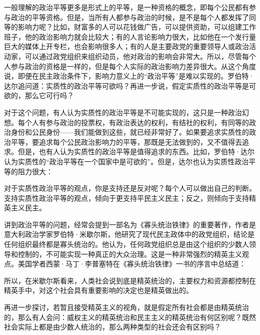 一般理解的政治平等更多是形式上的平等，是一种资格的概念，即每个公民都有参与政治的平等资格。但是，当所有人都参与政治的时候，是不是每个人都发挥了同等的影响力呢？比如，财富多的人可以花钱做广告，可以提供资助，可以组建工作班子，他的政治影响力就会比较大；有的人言论影响力很大，比如他在一个发行量巨大的媒体上开专栏，也会影响很多人；有的人是主要政党的重要领导人或政治活动家，可以通过政党组织来组织动员，他对政治的影响会非常大。所以，尽管每个人参与政治的资格是一样的，但是每个人实际的政治影响力差异很大。从这个角度说，即便在民主政治条件下，影响力意义上的“政治平等”是难以实现的。罗伯特·达尔追问道：实质性的政治平等可欲吗？再进一步说，假定实质性的政治平等是可欲的，那么它可行吗？

对于这个问题，有人认为实质性的政治平等是不可能实现的，这只是一种政治幻想。每个人有参与政治的投票权，有政治表达的权利，有结社的权利，有同等的政治身份和公民身份——我们能做到这些，就已经非常好了。如果要追求实质性的政治平等，要追求每个公民政治影响力的平等，那既是无法做到的，又不值得去追求。但是，也有人认为实质性的政治平等是值得追求的东西。比如，罗伯特·达尔认为实质性的“政治平等在一个国家中是可欲的”。但是，达尔也认为实质性政治平等的阻力很大：


对于实质性政治平等的观点，你是支持还是反对呢？每个人可以做出自己的判断。支持实质性政治平等的观点，倾向于更支持平民主义民主；反之，则倾向于支持精英主义民主。

讲到政治平等的问题，经常会提到一部名为《寡头统治铁律》的重要著作，作者是意大利政治学家罗伯特·米歇尔斯，他研究了现代民主政体中的政党组织，结论是任何组织最终都是寡头统治的。他认为，任何政党组织总是由这个组织的少数人领导和控制的，不可能实现一种真正的大众治理。这是一种非常强烈的精英主义观点。美国学者西蒙·马丁·李普塞特在《寡头统治铁律》一书的序言中总结道：


所以，在米歇尔斯看来，人类社会说到底是精英统治的，主要权力和资源都控制在精英手中，对这个社会具有重要影响的决定也是精英做出的。

再进一步探讨，若暂且接受精英主义的视角，就是假定所有社会都是由精英统治的，那么有人会问：威权主义的精英统治和民主主义的精英统治有何区别呢？既然社会实际上都是由少数人统治的，那么两种类型的社会还会有区别吗？

